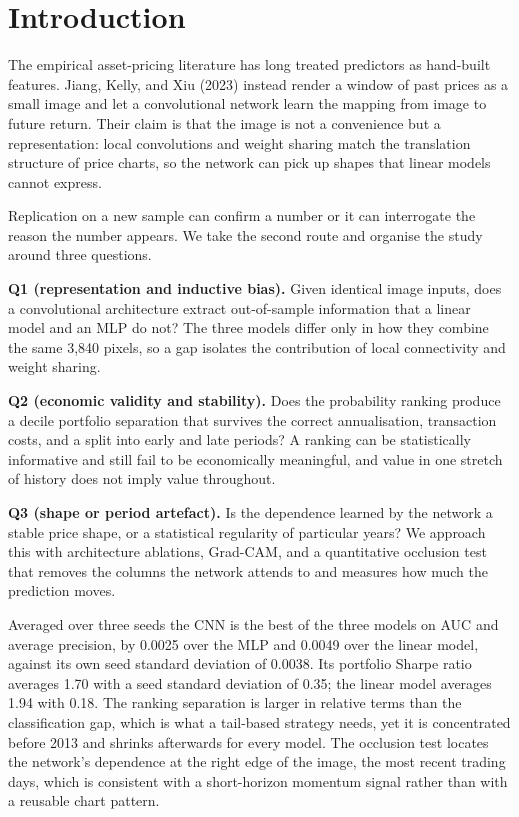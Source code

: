 \documentclass[10pt]{article}
\begin{document}
\section{Introduction}

The empirical asset-pricing literature has long treated predictors as hand-built features. Jiang, Kelly, and Xiu (2023) instead render a window of past prices as a small image and let a convolutional network learn the mapping from image to future return. Their claim is that the image is not a convenience but a representation: local convolutions and weight sharing match the translation structure of price charts, so the network can pick up shapes that linear models cannot express.

Replication on a new sample can confirm a number or it can interrogate the reason the number appears. We take the second route and organise the study around three questions.

\textbf{Q1 (representation and inductive bias).} Given identical image inputs, does a convolutional architecture extract out-of-sample information that a linear model and an MLP do not? The three models differ only in how they combine the same 3{,}840 pixels, so a gap isolates the contribution of local connectivity and weight sharing.

\textbf{Q2 (economic validity and stability).} Does the probability ranking produce a decile portfolio separation that survives the correct annualisation, transaction costs, and a split into early and late periods? A ranking can be statistically informative and still fail to be economically meaningful, and value in one stretch of history does not imply value throughout.

\textbf{Q3 (shape or period artefact).} Is the dependence learned by the network a stable price shape, or a statistical regularity of particular years? We approach this with architecture ablations, Grad-CAM, and a quantitative occlusion test that removes the columns the network attends to and measures how much the prediction moves.

Averaged over three seeds the CNN is the best of the three models on AUC and average precision, by 0.0025 over the MLP and 0.0049 over the linear model, against its own seed standard deviation of 0.0038. Its portfolio Sharpe ratio averages 1.70 with a seed standard deviation of 0.35; the linear model averages 1.94 with 0.18. The ranking separation is larger in relative terms than the classification gap, which is what a tail-based strategy needs, yet it is concentrated before 2013 and shrinks afterwards for every model. The occlusion test locates the network's dependence at the right edge of the image, the most recent trading days, which is consistent with a short-horizon momentum signal rather than with a reusable chart pattern.
\end{document}
